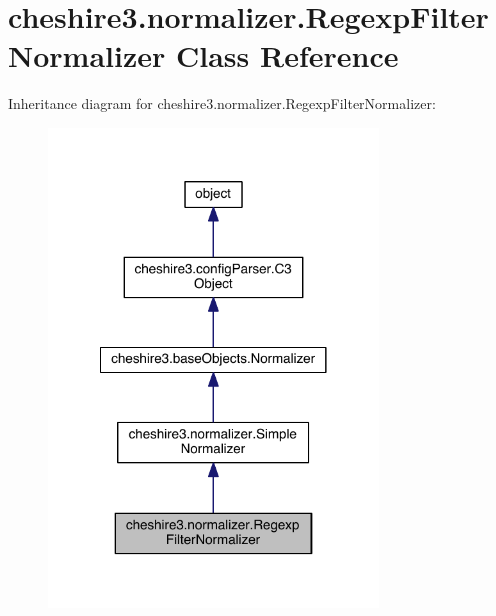 \hypertarget{classcheshire3_1_1normalizer_1_1_regexp_filter_normalizer}{\section{cheshire3.\-normalizer.\-Regexp\-Filter\-Normalizer Class Reference}
\label{classcheshire3_1_1normalizer_1_1_regexp_filter_normalizer}
}


Inheritance diagram for cheshire3.\-normalizer.\-Regexp\-Filter\-Normalizer\-:
\nopagebreak
\begin{figure}[H]
\begin{center}
\leavevmode
\includegraphics[width=248pt]{classcheshire3_1_1normalizer_1_1_regexp_filter_normalizer__inherit__graph}
\end{center}
\end{figure}


